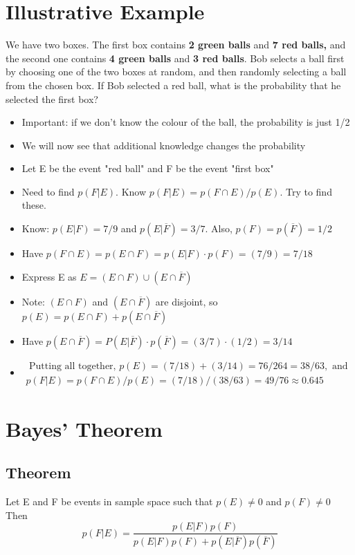 \documentclass{article}[18pt]
\begin{document}
\section{Illustrative Example}
We have two boxes. The first box contains \textbf{2 green balls} and \textbf{7 red
balls,} and the second one contains \textbf{4 green balls} and \textbf{3 red balls}.
Bob selects a ball first by choosing one of the two boxes at random, and then
randomly selecting a ball from the chosen box.
If Bob selected a red ball, what is the probability that he selected the first box?
\begin{itemize}
	\item Important: if we don't know the colour of the ball, the probability is just 1/2
	\item We will now see that additional knowledge changes the probability
	\item Let E be the event "red ball" and F be the event "first box"
	\item Need to find $p(F|E)$. Know $p(F|E)=p(F\cap E)/p(E)$. Try to find these.
	\item Know: $p(E|F)=7/9$ and $p(E|\overline{F})=3/7$. Also, $p(F)=p(\overline{F})=1/2$
	\item Have $p ( F \cap E ) = p ( E \cap F ) = p ( E | F ) \cdot p ( F ) = ( 7 / 9 ) = 7 / 18$
	\item Express E as $E=( E \cap F ) \cup ( E \cap \overline { F } )$
	\item Note: $(E\cap F)$ and $(E\cap \overline{ F })$ are disjoint, so $p ( E ) = p ( E \cap F ) + p ( E \cap \overline { F } )$
	\item Have $p ( E \cap \overline { F } ) = P ( E | \overline { F } ) \cdot p ( \overline { F } ) = ( 3 / 7 ) \cdot ( 1 / 2 ) = 3 / 14$
	\item $\begin{array} { l } { \text { Putting all together, } p ( E ) = ( 7 / 18 ) + ( 3 / 14 ) = 76 / 264 = 38 / 63 , \text { and } } \\ { p ( F | E ) = p ( F \cap E ) / p ( E ) = ( 7 / 18 ) / ( 38 / 63 ) = 49 / 76 \approx 0.645 } \end{array}$
\end{itemize}
\section{Bayes' Theorem}
\subsection{Theorem}
Let E and F be events in sample space such that $p(E)\neq 0$ and $p(F)\neq 0$ Then
$$p ( F | E ) = \frac { p ( E | F ) p ( F ) } { p ( E | F ) p ( F ) + p ( E | \overline { F } ) p ( \overline { F } ) }$$
\end{document}
